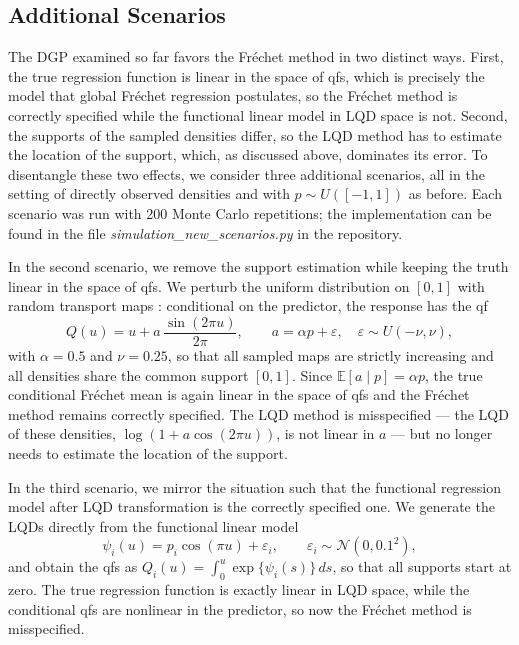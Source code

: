 \subsection{Additional Scenarios}
\label{sec:app_additional_scenarios}
The DGP examined so far favors the Fréchet method in two distinct ways. First, the
true regression function is linear in the space of qfs, which is precisely the model
that global Fréchet regression postulates, so the Fréchet method is correctly
specified while the functional linear model in LQD space is not. Second, the supports
of the sampled densities differ, so the LQD method has to estimate the location of
the support, which, as discussed above, dominates its error. To disentangle these two
effects, we consider three additional scenarios, all in the setting of directly
observed densities and with $p \sim U([-1,1])$ as before. Each scenario was run with
200 Monte Carlo repetitions; the implementation can be found in the file
\textit{simulation\_new\_scenarios.py} in the repository.

In the second scenario, we remove the support estimation while keeping the truth
linear in the space of qfs. We perturb the uniform distribution on $[0,1]$ with
random transport maps \parencite[cf.][]{PanaretosZemel2016}: conditional on the
predictor, the response has the qf
\[
    Q(u) = u + a \, \frac{\sin(2 \pi u)}{2 \pi}, \qquad
    a = \alpha p + \varepsilon, \quad \varepsilon \sim U(-\nu, \nu),
\]
with $\alpha = 0.5$ and $\nu = 0.25$, so that all sampled maps are strictly
increasing and all densities share the common support $[0,1]$. Since
$\mathbb{E}[a \mid p] = \alpha p$, the true conditional Fréchet mean is again linear
in the space of qfs and the Fréchet method remains correctly specified. The LQD
method is misspecified --- the LQD of these densities,
$\log(1 + a\cos(2\pi u))$, is not linear in $a$ --- but no longer needs to estimate
the location of the support.

In the third scenario, we mirror the situation such that the functional regression
model after LQD transformation is the correctly specified one. We generate the LQDs
directly from the functional linear model
\[
    \psi_i(u) = p_i \cos(\pi u) + \varepsilon_i, \qquad
    \varepsilon_i \sim \mathcal{N}(0, 0.1^2),
\]
and obtain the qfs as $Q_i(u) = \int_0^u \exp\{\psi_i(s)\}\,ds$, so that all supports
start at zero. The true regression function is exactly linear in LQD space, while the
conditional qfs are nonlinear in the predictor, so now the Fréchet method is
misspecified.


